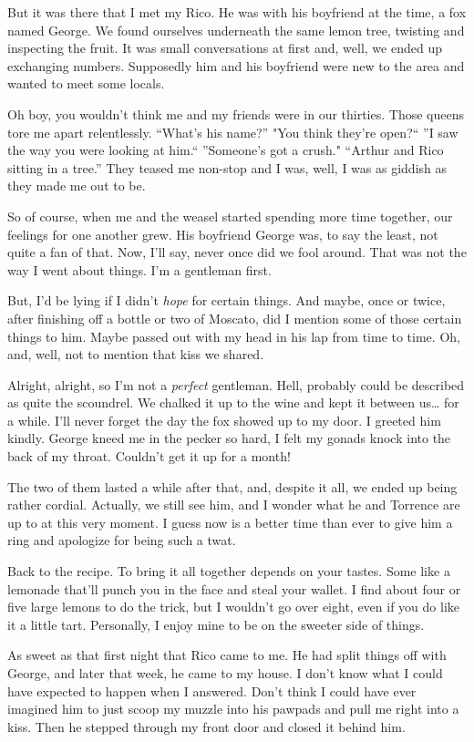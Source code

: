 But it was there that I met my Rico. He was with his boyfriend at the
time, a fox named George. We found ourselves underneath the same lemon
tree, twisting and inspecting the fruit. It was small conversations at
first and, well, we ended up exchanging numbers. Supposedly him and his
boyfriend were new to the area and wanted to meet some locals.

Oh boy, you wouldn't think me and my friends were in our thirties. Those
queens tore me apart relentlessly. ``What's his name?'' "You think they're
open?`` ''I saw the way you were looking at him.`` ''Someone's got a crush."
``Arthur and Rico sitting in a tree.'' They teased me non-stop and I was,
well, I was as giddish as they made me out to be.

So of course, when me and the weasel started spending more time
together, our feelings for one another grew. His boyfriend George was,
to say the least, not quite a fan of that. Now, I'll say, never once did
we fool around. That was not the way I went about things. I'm a
gentleman first.

But, I'd be lying if I didn't \emph{hope} for certain things. And maybe,
once or twice, after finishing off a bottle or two of Moscato, did I
mention some of those certain things to him. Maybe passed out with my
head in his lap from time to time. Oh, and, well, not to mention that
kiss we shared.

Alright, alright, so I'm not a \emph{perfect} gentleman. Hell, probably
could be described as quite the scoundrel. We chalked it up to the wine
and kept it between us\ldots{} for a while. I'll never forget the day
the fox showed up to my door. I greeted him kindly. George kneed me in
the pecker so hard, I felt my gonads knock into the back of my throat.
Couldn't get it up for a month!

The two of them lasted a while after that, and, despite it all, we ended
up being rather cordial. Actually, we still see him, and I wonder what
he and Torrence are up to at this very moment. I guess now is a better
time than ever to give him a ring and apologize for being such a twat.

Back to the recipe. To bring it all together depends on your tastes.
Some like a lemonade that'll punch you in the face and steal your
wallet. I find about four or five large lemons to do the trick, but I
wouldn't go over eight, even if you do like it a little tart.
Personally, I enjoy mine to be on the sweeter side of things.

As sweet as that first night that Rico came to me. He had split things
off with George, and later that week, he came to my house. I don't know
what I could have expected to happen when I answered. Don't think I
could have ever imagined him to just scoop my muzzle into his pawpads
and pull me right into a kiss. Then he stepped through my front door and
closed it behind him.


